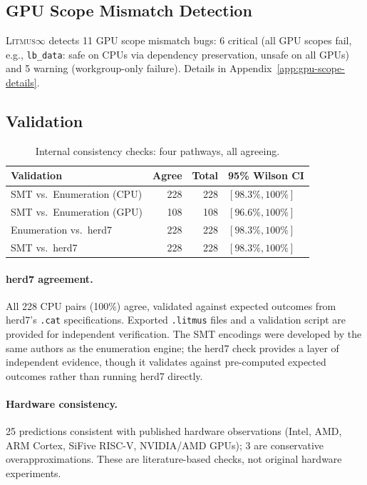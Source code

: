 \documentclass[11pt]{article}
\newcommand{\litmus}{\textsc{Litmus$\infty$}}
\begin{document}
\subsection{GPU Scope Mismatch Detection}
\label{sec:gpu-scope}

\litmus{} detects 11 GPU scope mismatch bugs: 6 critical (all GPU
scopes fail, e.g., \texttt{lb\_data}: safe on CPUs via dependency
preservation, unsafe on all GPUs) and 5 warning (workgroup-only
failure). Details in Appendix~\ref{app:gpu-scope-details}.

\subsection{Validation}
\label{sec:validation}

\begin{table}[ht]
\centering
\caption{Internal consistency checks: four pathways, all agreeing.}
\label{tab:validation}
\small
\begin{tabular}{lrrl}
\toprule
\textbf{Validation} & \textbf{Agree} & \textbf{Total} & \textbf{95\% Wilson CI} \\
\midrule
SMT vs.\ Enumeration (CPU) & 228 & 228 & $[98.3\%, 100\%]$ \\
SMT vs.\ Enumeration (GPU) & 108 & 108 & $[96.6\%, 100\%]$ \\
Enumeration vs.\ herd7     & 228 & 228 & $[98.3\%, 100\%]$ \\
SMT vs.\ herd7             & 228 & 228 & $[98.3\%, 100\%]$ \\
\bottomrule
\end{tabular}
\end{table}

\paragraph{herd7 agreement.}
All 228 CPU pairs (100\%) agree, validated against expected outcomes
from herd7's \texttt{.cat} specifications.
Exported \texttt{.litmus} files and a validation script
are provided for independent verification.
The SMT encodings were developed by the same authors as the
enumeration engine; the herd7 check provides a layer of
independent evidence, though it validates against pre-computed
expected outcomes rather than running herd7 directly.

\paragraph{Hardware consistency.}
25 predictions consistent with published hardware observations
(Intel, AMD, ARM Cortex, SiFive RISC-V, NVIDIA/AMD GPUs);
3 are conservative overapproximations. These are literature-based
checks, not original hardware experiments.
\end{document}
